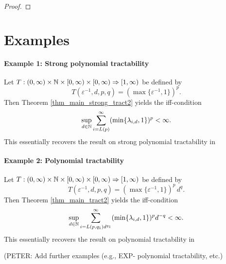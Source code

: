 \documentclass[11pt,a4paper]{article}
\newcommand{\peter}[1]{\begingroup\color{purple}#1\endgroup}
\begin{document}
{\begin{proof}
\end{proof}


\section{Examples}

\paragraph{Example 1: Strong polynomial tractability}

Let $T: (0,\infty) \times \mathbb{N} \times [0,\infty) \times [0,\infty)\Rightarrow [1,\infty)$ 
be defined by 
\[
 T(\varepsilon^{-1},d,p,q)= (\max\{\varepsilon^{-1},1\})^p .
\]
Then Theorem \ref{thm_main_strong_tract2} yields the iff-condition
\[
 \sup_{d\in\mathbb{N}} \sum_{i=L(p)}^\infty (\min\{\lambda_{i,d},1\})^p < \infty.
\]
This essentially recovers the result on strong polynomial tractability in \cite[Theorem 5.1]{NW08}

\paragraph{Example 2: Polynomial tractability}

Let $T: (0,\infty) \times \mathbb{N} \times [0,\infty) \times [0,\infty)\Rightarrow [1,\infty)$ 
be defined by 
\[
 T(\varepsilon^{-1},d,p,q)= (\max\{\varepsilon^{-1},1\})^p\, d^q.
\]
Then Theorem \ref{thm_main_tract2} yields the iff-condition
\[
 \sup_{d\in\mathbb{N}} \sum_{i=L(p,q_1) d^{q_1}}^\infty (\min\{\lambda_{i,d},1\})^p d^{-q} < \infty.
\]
This essentially recovers the result on polynomial tractability in \cite[Theorem 5.1]{NW08}



\peter{(PETER: Add further examples (e.g., EXP- polynomial tractability, etc.)}

\bigskip

}
\end{document}

